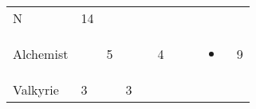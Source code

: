 \documentclass[12pt]{article}
\begin{document}
\begin{longtable}[]{@{}llllllllll@{}}
\begin{minipage}[t]{0.07\columnwidth}
N
\strut\end{minipage} &
\begin{minipage}[t]{0.08\columnwidth}\raggedright\strut
14
\strut\end{minipage}\tabularnewline
\begin{minipage}[t]{0.13\columnwidth}\raggedright\strut
Alchemist
\strut\end{minipage} &
\begin{minipage}[t]{0.06\columnwidth}\raggedright\strut
\strut\end{minipage} &
\begin{minipage}[t]{0.06\columnwidth}\raggedright\strut
5
\strut\end{minipage} &
\begin{minipage}[t]{0.06\columnwidth}\raggedright\strut
\strut\end{minipage} &
\begin{minipage}[t]{0.06\columnwidth}\raggedright\strut
\strut\end{minipage} &
\begin{minipage}[t]{0.06\columnwidth}\raggedright\strut
4
\strut\end{minipage} &
\begin{minipage}[t]{0.06\columnwidth}\raggedright\strut
\strut\end{minipage} &
\begin{minipage}[t]{0.06\columnwidth}\raggedright\strut
\strut\end{minipage} &
\begin{minipage}[t]{0.07\columnwidth}\raggedright\strut
\begin{itemize}
\item
\end{itemize}
\strut\end{minipage} &
\begin{minipage}[t]{0.08\columnwidth}\raggedright\strut
9
\strut\end{minipage}\tabularnewline
\begin{minipage}[t]{0.13\columnwidth}\raggedright\strut
Valkyrie
\strut\end{minipage} &
\begin{minipage}[t]{0.06\columnwidth}\raggedright\strut
3
\strut\end{minipage} &
\begin{minipage}[t]{0.06\columnwidth}\raggedright\strut
\strut\end{minipage} &
\begin{minipage}[t]{0.06\columnwidth}\raggedright\strut
3

\end{minipage}
\end{longtable}
\end{document}
